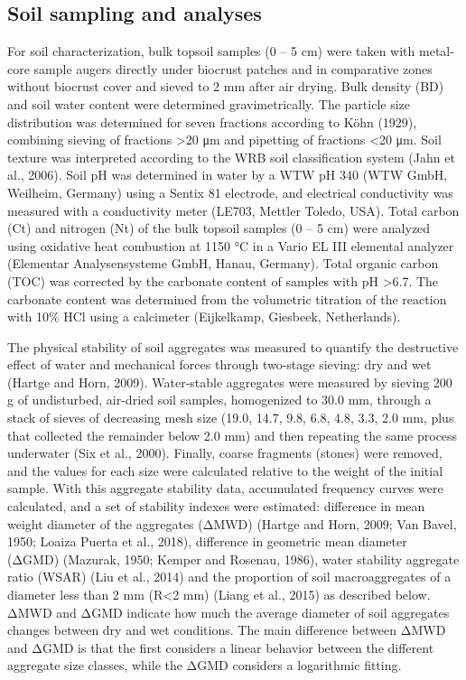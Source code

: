 \FloatBarrier

\subsection{Soil sampling and analyses}

For soil characterization, bulk topsoil samples (0 – 5 cm) were taken with metal-core sample augers directly under biocrust patches and in comparative zones without biocrust cover and sieved to 2 mm after air drying. Bulk density (BD) and soil water content were determined gravimetrically. The particle size distribution was determined for seven fractions according to Köhn (1929), combining sieving of fractions >20 μm and pipetting of fractions <20 μm. Soil texture was interpreted according to the WRB soil classification system (Jahn et al., 2006). Soil pH was determined in water by a WTW pH 340 (WTW GmbH, Weilheim, Germany) using a Sentix 81 electrode, and electrical conductivity was measured with a conductivity meter (LE703, Mettler Toledo, USA). Total carbon (Ct) and nitrogen (Nt) of the bulk topsoil samples (0 – 5 cm) were analyzed using oxidative heat combustion at 1150 °C in a Vario EL III elemental analyzer (Elementar Analysensysteme GmbH, Hanau, Germany). Total organic carbon (TOC) was corrected by the carbonate content of samples with pH >6.7. The carbonate content was determined from the volumetric titration of the reaction with 10\% HCl using a calcimeter (Eijkelkamp, Giesbeek, Netherlands).

The physical stability of soil aggregates was measured to quantify the destructive effect of water and mechanical forces through two-stage sieving: dry and wet (Hartge and Horn, 2009). Water-stable aggregates were measured by sieving 200 g of undisturbed, air-dried soil samples, homogenized to 30.0 mm, through a stack of sieves of decreasing mesh size (19.0, 14.7, 9.8, 6.8, 4.8, 3.3, 2.0 mm, plus that collected the remainder below 2.0 mm) and then repeating the same process underwater (Six et al., 2000). Finally, coarse fragments (stones) were removed, and the values for each size were calculated relative to the weight of the initial sample. With this aggregate stability data, accumulated frequency curves were calculated, and a set of stability indexes were estimated: difference in mean weight diameter of the aggregates (ΔMWD) (Hartge and Horn, 2009; Van Bavel, 1950; Loaiza Puerta et al., 2018), difference in geometric mean diameter (ΔGMD) (Mazurak, 1950; Kemper and Rosenau, 1986), water stability aggregate ratio (WSAR) (Liu et al., 2014) and the proportion of soil macroaggregates of a diameter less than 2 mm (R<2 mm) (Liang et al., 2015) as described below. ΔMWD and ΔGMD indicate how much the average diameter of soil aggregates changes between dry and wet conditions. The main difference between ΔMWD and ΔGMD is that the first considers a linear behavior between the different aggregate size classes, while the ΔGMD considers a logarithmic fitting.

